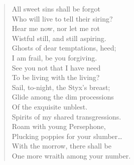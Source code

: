 \begin{verse}
\vspace{0.75em}
All sweet sins shall be forgot\\\empty{}
\hspace{1em}Who will live to tell their siring?\\\empty{}
Hear me now, nor let me rot\\\empty{}
\hspace{1em}Wistful still, and still aspiring.\\\empty{}
\vspace{0.75em}
Ghosts of dear temptations, heed;\\\empty{}
\hspace{1em}I am frail, be you forgiving.\\\empty{}
See you not that I have need\\\empty{}
\hspace{1em}To be living with the living?\\\empty{}
\vspace{0.75em}
Sail, to-night, the Styx's breast;\\\empty{}
\hspace{1em}Glide among the dim processions\\\empty{}
Of the exquisite unblest.\\\empty{}
\hspace{1em}Spirits of my shared transgressions.\\\empty{}
\vspace{0.75em}
Roam with young Persephone,\\\empty{}
\hspace{1em}Plucking poppies for your slumber\ldots{}\\\empty{}
With the morrow, there shall be\\\empty{}
\hspace{1em}One more wraith among your number.\\\empty{}
\end{verse}

